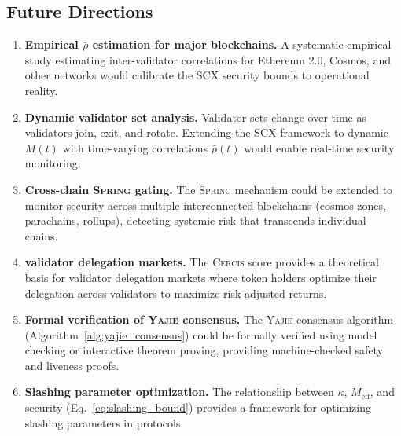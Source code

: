 \documentclass[11pt,a4paper]{article}
\theoremstyle{definition}
\newcommand{\Yajie}{\textsc{Yajie}}
\newcommand{\Spring}{\textsc{Spring}}
\newcommand{\Cercis}{\textsc{Cercis}}
\newcommand{\SCX}{\textsc{SCX}}
\newcommand{\PoS}{\mathrm{PoS}}
\begin{document}
\subsection{Future Directions}
\begin{enumerate}[label=(\roman*)]
    \item \textbf{Empirical $\bar{\rho}$ estimation for major blockchains.} A systematic empirical study estimating inter-validator correlations for Ethereum 2.0, Cosmos, and other \PoS{} networks would calibrate the \SCX{} security bounds to operational reality.
    \item \textbf{Dynamic validator set analysis.} Validator sets change over time as validators join, exit, and rotate. Extending the \SCX{} framework to dynamic $M(t)$ with time-varying correlations $\bar{\rho}(t)$ would enable real-time security monitoring.
    \item \textbf{Cross-chain \Spring{} gating.} The \Spring{} mechanism could be extended to monitor security across multiple interconnected blockchains (cosmos zones, parachains, rollups), detecting systemic risk that transcends individual chains.
    \item \textbf{\Cris{} validator delegation markets.} The \Cercis{} score provides a theoretical basis for validator delegation markets where token holders optimize their delegation across validators to maximize risk-adjusted returns.
    \item \textbf{Formal verification of \Yajie{} consensus.} The \Yajie{} consensus algorithm (Algorithm~\ref{alg:yajie_consensus}) could be formally verified using model checking or interactive theorem proving, providing machine-checked safety and liveness proofs.
    \item \textbf{Slashing parameter optimization.} The relationship between $\kappa$, $M_{\mathrm{eff}}$, and security (Eq.~\ref{eq:slashing_bound}) provides a framework for optimizing slashing parameters in \PoS{} protocols.
\end{enumerate}
\end{document}
